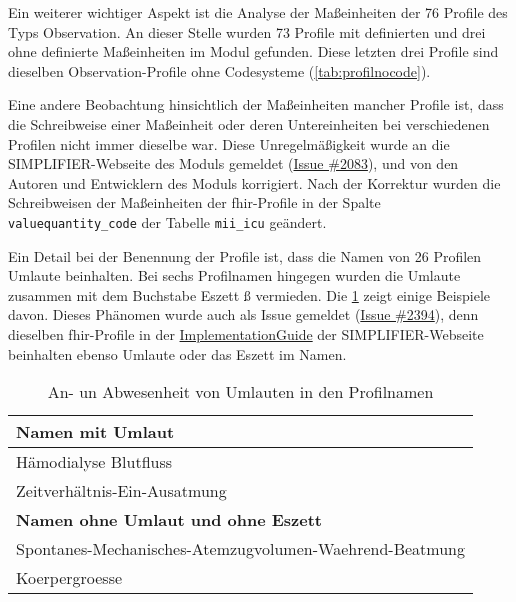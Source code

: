 Ein weiterer wichtiger Aspekt ist die Analyse der Maßeinheiten der 76 Profile des Typs \glqq Observation\grqq{}. An dieser Stelle wurden 73 Profile mit definierten und drei ohne definierte Maßeinheiten im Modul gefunden. Diese letzten drei Profile sind dieselben \glqq Observation\grqq{}-Profile ohne Codesysteme (\ref{tab:profilnocode}).

Eine andere Beobachtung hinsichtlich der Maßeinheiten mancher Profile ist, dass die Schreibweise einer Maßeinheit oder deren Untereinheiten bei verschiedenen Profilen nicht immer dieselbe war. Diese Unregelmäßigkeit wurde an die SIMPLIFIER-Webseite des Moduls gemeldet (\href{https://simplifier.net/medizininformatikinitiative-modul-intensivmedizin/~issues/2083}{Issue \#2083}), und von den Autoren und Entwicklern des Moduls korrigiert. Nach der Korrektur wurden die Schreibweisen der Maßeinheiten der \ac{fhir}-Profile in der Spalte \texttt{valuequantity\_code} der Tabelle \texttt{mii\_icu} geändert.

Ein Detail bei der Benennung der Profile ist, dass die Namen von 26 Profilen Umlaute beinhalten. Bei sechs Profilnamen hingegen wurden die Umlaute zusammen mit dem Buchstabe Eszett \glqq ß\grqq{} vermieden. Die \ref{tab:umlaut} zeigt einige Beispiele davon. Dieses Phänomen wurde auch als Issue gemeldet (\href{https://simplifier.net/medizininformatikinitiative-modul-intensivmedizin/~issues/2394}{Issue \#2394}), denn dieselben \ac{fhir}-Profile in der \href{https://simplifier.net/guide/MedizininformatikInitiative-ModulICU-ImplementationGuide/IGMIIKDSModulICU?version=current}{ImplementationGuide} der SIMPLIFIER-Webseite beinhalten ebenso Umlaute oder das Eszett im Namen.

\begin{table}[ht]
	\centering 
	\caption[An- un Abwesenheit von Umlauten in den Profilnamen]{An- un Abwesenheit von Umlauten in den Profilnamen}
	\label{tab:umlaut}
	\begin{tabular}{|l|}
		\hline 
		\bfseries Namen mit Umlaut \\ \hline
		Hämodialyse Blutfluss \\ \hline 
		Zeitverhältnis-Ein-Ausatmung \\ \hline \hline
		\bfseries Namen ohne Umlaut und ohne Eszett\\ \hline
	    Spontanes-Mechanisches-Atemzugvolumen-Waehrend-Beatmung\\ \hline            
		Koerpergroesse \\ \hline                
	\end{tabular}
\end{table}